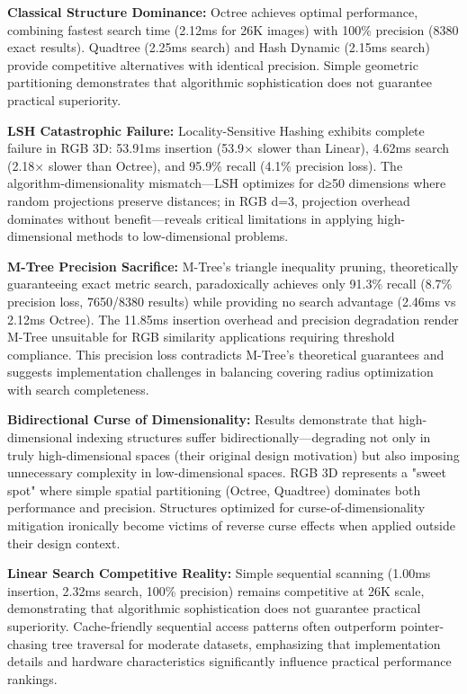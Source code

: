 \documentclass{sbc2023}
\begin{document}
\textbf{Classical Structure Dominance:} Octree achieves optimal performance, combining fastest search time (2.12ms for 26K images) with 100\% precision (8380 exact results). Quadtree (2.25ms search) and Hash Dynamic (2.15ms search) provide competitive alternatives with identical precision. Simple geometric partitioning demonstrates that algorithmic sophistication does not guarantee practical superiority.

\textbf{LSH Catastrophic Failure:} Locality-Sensitive Hashing exhibits complete failure in RGB 3D: 53.91ms insertion (53.9× slower than Linear), 4.62ms search (2.18× slower than Octree), and 95.9\% recall (4.1\% precision loss). The algorithm-dimensionality mismatch—LSH optimizes for d≥50 dimensions where random projections preserve distances; in RGB d=3, projection overhead dominates without benefit—reveals critical limitations in applying high-dimensional methods to low-dimensional problems.

\textbf{M-Tree Precision Sacrifice:} M-Tree's triangle inequality pruning, theoretically guaranteeing exact metric search, paradoxically achieves only 91.3\% recall (8.7\% precision loss, 7650/8380 results) while providing no search advantage (2.46ms vs 2.12ms Octree). The 11.85ms insertion overhead and precision degradation render M-Tree unsuitable for RGB similarity applications requiring threshold compliance. This precision loss contradicts M-Tree's theoretical guarantees and suggests implementation challenges in balancing covering radius optimization with search completeness.

\textbf{Bidirectional Curse of Dimensionality:} Results demonstrate that high-dimensional indexing structures suffer bidirectionally—degrading not only in truly high-dimensional spaces (their original design motivation) but also imposing unnecessary complexity in low-dimensional spaces. RGB 3D represents a "sweet spot" where simple spatial partitioning (Octree, Quadtree) dominates both performance and precision. Structures optimized for curse-of-dimensionality mitigation ironically become victims of reverse curse effects when applied outside their design context.

\textbf{Linear Search Competitive Reality:} Simple sequential scanning (1.00ms insertion, 2.32ms search, 100\% precision) remains competitive at 26K scale, demonstrating that algorithmic sophistication does not guarantee practical superiority. Cache-friendly sequential access patterns often outperform pointer-chasing tree traversal for moderate datasets, emphasizing that implementation details and hardware characteristics significantly influence practical performance rankings.
\end{document}
